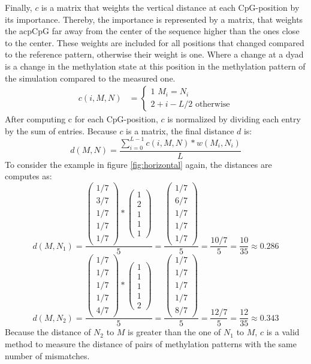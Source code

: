 Finally, $c$ is a matrix that weights the vertical distance at each \ac{CpG}-position by its importance. Thereby, the importance is represented by a matrix, that weights the acp{CpG} far away from the center of the sequence higher than the ones close to the center. These weights are included for all positions that changed compared to the reference pattern, otherwise their weight is one. Where a change at a dyad is a change in the methylation state at this position in the methylation pattern of the simulation compared to the measured one.
\begin{align*}
c(i,M,N) &= \left\{
\begin{array}{l}
\text{1 } M_i = N_i\\
2+ i - L/2 \text{ otherwise}
\end{array}
\right.
\end{align*}
After computing c for each \ac{CpG}-position, $c$ is normalized by dividing each entry by the sum of entries. Because $c$ is a matrix, the final distance $d$ is:
\[d(M,N) = \dfrac{\sum^{L-1}_{i=0}{c(i,M,N)*w(M_i,N_i)}}{L}\]
To consider the example in figure \ref{fig:horizontal} again, the distances are computes as:
\[d(M,N_1) = \dfrac{\begin{pmatrix}1/7\\ 3/7\\ 1/7\\ 1/7\\ 1/7\end{pmatrix} * \begin{pmatrix}1\\ 2\\ 1\\ 1\\ 1\end{pmatrix}}{5} = \dfrac{\begin{pmatrix}1/7\\ 6/7\\ 1/7\\ 1/7\\ 1/7\end{pmatrix}}{5} = \dfrac{10/7}{5} = \dfrac{10}{35} \approx 0.286\]
\[d(M,N_2) = \dfrac{\begin{pmatrix}1/7\\ 1/7\\ 1/7\\ 1/7\\ 4/7\end{pmatrix} * \begin{pmatrix}1\\ 1\\ 1\\ 1\\ 2\end{pmatrix}}{5} = \dfrac{\begin{pmatrix}1/7\\ 1/7\\ 1/7\\ 1/7\\ 8/7\end{pmatrix}}{5} = \dfrac{12/7}{5} = \dfrac{12}{35} \approx 0.343\]
Because the distance of $N_2$ to $M$ is greater than the one of $N_1$ to $M$, $c$ is a valid method to measure the distance of pairs of methylation patterns with the same number of mismatches.